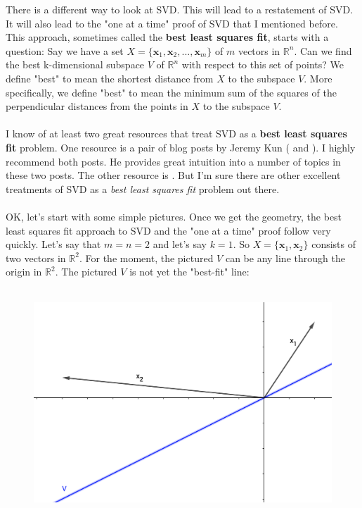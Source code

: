 \documentclass{tufte-handout}
\newcommand{\Waynehref}[3][blue]{\href{#2}{\color{#1}{#3}}}%
\begin{document}
\noindent There is a different way to look at SVD. This will lead to a restatement of SVD. It will also lead to the "one at a time" proof of SVD that I mentioned before. This approach, sometimes called the \textbf{best least squares fit}, starts with a question: Say we have a set $X=\{\mathbf{x}_1, \mathbf{x}_2, ..., \mathbf{x}_m\}$ of $m$ vectors in $\mathbb{R}^n$. Can we find the best k-dimensional subspace $V$ of $\mathbb{R}^n$ with respect to this set of points? We define "best" to mean the shortest distance from $X$ to the subspace $V$. More specifically, we define "best" to mean the minimum sum of the squares of the perpendicular distances from the points in $X$ to the subspace $V$.\\\leavevmode\\

\noindent I know of at least two great resources that treat SVD as a \textbf{best least squares fit} problem. One resource is a pair of blog posts by Jeremy Kun (\Waynehref{https://jeremykun.com/2016/04/18/singular-value-decomposition-part-1-perspectives-on-linear-algebra/}{SVD 1} and \Waynehref{https://jeremykun.com/2016/05/16/singular-value-decomposition-part-2-theorem-proof-algorithm/}{SVD 2}). I highly recommend both posts. He provides great intuition into a number of topics in these two posts. The other resource is \Waynehref{https://www.cs.princeton.edu/courses/archive/spring12/cos598C/svdchapter.pdf}{here}. But I'm sure there are other excellent treatments of SVD  as a \textit{best least squares fit} problem out there.\\\leavevmode\\

\noindent OK, let's start with some simple pictures. Once we get the geometry, the best least squares fit approach to SVD and the "one at a time" proof follow very quickly. Let's say that $m=n=2$ and let's say $k=1$. So $X=\{\mathbf{x}_1, \mathbf{x}_2\}$ consists of two vectors in $\mathbb{R}^2$. For the moment, the pictured $V$ can be any line through the origin in $\mathbb{R}^2$. The pictured $V$ is not yet the "best-fit" line: \\\leavevmode\\
\begin{figure}
	\centering
	\includegraphics[width=0.7\linewidth]{svd-pic-01}
	\caption{}
	\label{fig:svd-pic-01}
\end{figure}
\end{document}
